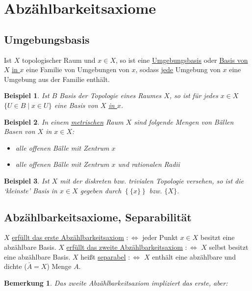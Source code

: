 \documentclass[a4paper,11pt,notitlepage]{report}
\newtheorem{remark}{Bemerkung}[chapter]
\newtheorem{example}{Beispiel}[chapter]
\newenvironment{Kasten}[1]
{
\hspace{0.05\linewidth}
\begin{center}
\begin{minipage}{0.9\linewidth}
\setlength{\fboxsep}{10pt}
\definecolor{shadecolor}{gray}{1}
\definecolor{framecolor}{gray}{0}
\def\FrameCommand{\fcolorbox{framecolor}{shadecolor}}
\MakeFramed {\FrameRestore}
\subsection{#1}
\begin{itshape}
}
{
\end{itshape}
\endMakeFramed
\end{minipage}
\end{center}
}
\begin{document}
\section{Abzählbarkeitsaxiome}
\begin{Kasten}{Umgebungsbasis}
	Ist $X$ topologischer Raum und $x \in X$, so ist eine \underline{Umgebungsbasis} oder \underline{Basis von $X$} \underline{\underline{in $x$}} eine Familie von Umgebungen von $x$, sodass \underline{jede} Umgebung von $x$ eine Umgebung aus der Familie enthält.
\end{Kasten}

\begin{example}
	Ist $B$ Basis der Topologie eines Raumes $X$, so ist für jedes $x \in X$ $\{U \in B \mid x \in U\}$ eine Basis von $X$ \underline{\underline{in $x$}}.
\end{example}

\begin{example}
	In einem \underline{metrischen} Raum $X$ sind folgende Mengen von Bällen Basen von $X$ in $x \in X$:
	\begin{itemize}
		\item alle offenen Bälle mit Zentrum $x$
		\item alle offenen Bälle mit Zentrum $x$ und rationalen Radii
	\end{itemize}
\end{example}

\begin{example}
	\label{UmgebungsbasisDiskreteTopologie}
	Ist $X$ mit der diskreten bzw. trivialen Topologie versehen, so ist die `kleinste' Basis in $x \in X$ gegeben durch $\left\{\{x\}\right\}$ bzw. $\{X\}$.
\end{example}

\begin{Kasten}{Abzählbarkeitsaxiome, Separabilität}
	$X$ \underline{erfüllt das erste Abzählbarkeitsaxiom}
	$:\Leftrightarrow$ jeder Punkt $x \in X$ besitzt eine abzählbare Basis.
	\newline
	$X$ \underline{erfüllt das zweite Abzählbarkeitsaxiom}
	$:\Leftrightarrow$ $X$ selbst besitzt eine abzählbare Basis.
	\newline
	$X$ heißt \underline{separabel} $:\Leftrightarrow$ $X$ enthält eine abzählbare und dichte ($\bar{A} = X$) Menge $A$.
\end{Kasten}
 
\begin{remark}
	Das zweite Abzählbarkeitsaxiom impliziert das erste, aber:
\end{remark} 
\end{document}
